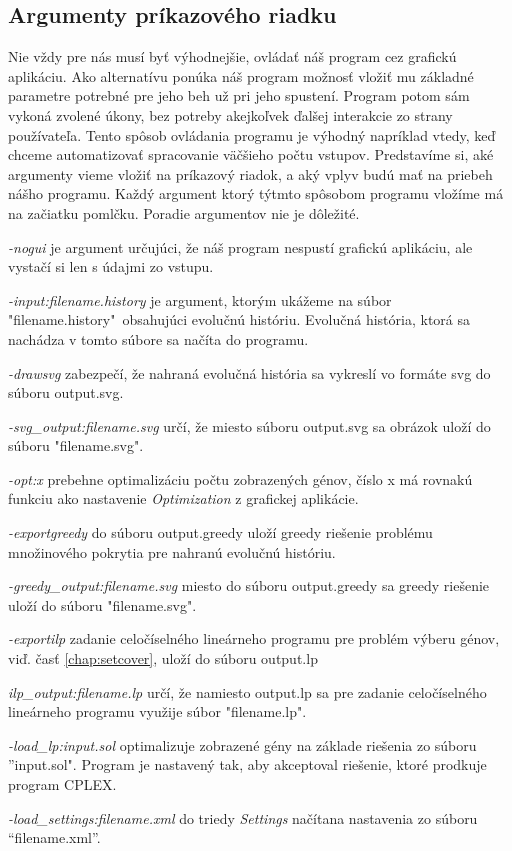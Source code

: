 \subsection{Argumenty príkazového riadku}
Nie vždy pre nás musí byť výhodnejšie, ovládať náš program cez grafickú aplikáciu. 
Ako alternatívu ponúka náš program možnosť vložiť mu základné parametre potrebné pre jeho beh už pri jeho spustení.
Program potom sám vykoná zvolené úkony, bez potreby akejkoľvek ďalšej interakcie zo strany používateľa. 
Tento spôsob ovládania programu je výhodný napríklad vtedy, keď chceme automatizovať spracovanie väčšieho počtu vstupov.
Predstavíme si, aké argumenty vieme vložiť na príkazový riadok, a aký vplyv budú mať na priebeh nášho programu. 
Každý argument ktorý týtmto spôsobom programu vložíme má na začiatku pomlčku. Poradie argumentov nie je dôležité.

\emph{-nogui} je argument určujúci, že náš program nespustí grafickú aplikáciu, ale vystačí si len s údajmi zo vstupu.

\emph{-input:filename.history} je argument, ktorým ukážeme na súbor "filename.history"\ obsahujúci evolučnú históriu.
Evolučná história, ktorá sa nachádza v tomto súbore sa načíta do programu.

\emph{-drawsvg} zabezpečí, že nahraná evolučná história sa vykreslí vo formáte svg do súboru output.svg.

\emph{-svg\_output:filename.svg} určí, že miesto súboru output.svg sa obrázok uloží do súboru "filename.svg".

\emph{-opt:x} prebehne optimalizáciu počtu zobrazených génov, číslo x má rovnakú funkciu ako nastavenie \emph{Optimization} z grafickej aplikácie.

\emph{-exportgreedy} do súboru output.greedy uloží greedy riešenie problému množinového pokrytia pre nahranú evolučnú históriu.

\emph{-greedy\_output:filename.svg} miesto do súboru output.greedy sa greedy riešenie uloží do súboru "filename.svg".

\emph{-exportilp} zadanie celočíselného lineárneho programu pre problém výberu génov, viď. časť \ref{chap:setcover}, uloží do súboru output.lp

\emph{ilp\_output:filename.lp} určí, že namiesto output.lp sa pre zadanie celočíselného lineárneho programu využije súbor "filename.lp".

\emph{-load\_lp:input.sol} optimalizuje zobrazené gény na základe riešenia zo súboru ''input.sol".
Program je nastavený tak, aby akceptoval riešenie, ktoré prodkuje program CPLEX.

\emph{-load\_settings:filename.xml} do triedy \emph{Settings} načítana nastavenia zo súboru ``filename.xml''.

